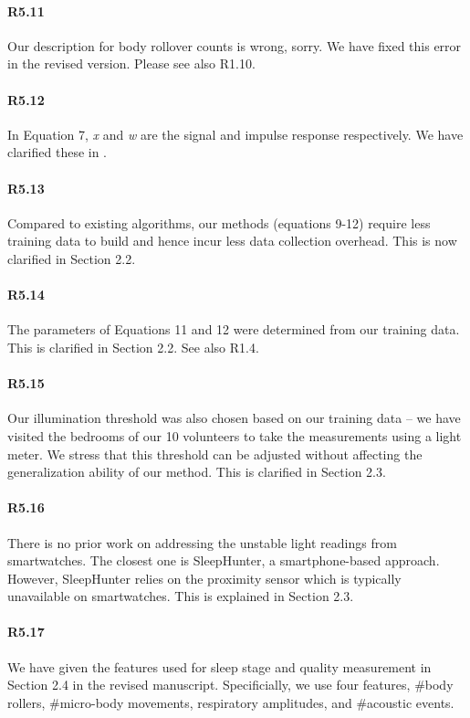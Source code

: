 \paragraph{R5.11} Our description for body rollover counts is wrong, sorry. We have fixed this error in the revised version. Please see
also R1.10.


\paragraph{R5.12} In Equation 7, \emph{x} and \emph{w} are the signal and impulse response respectively. We have clarified these in
.

\paragraph{R5.13} Compared to existing algorithms, our methods (equations 9-12) require less training data to build and hence incur less
data collection overhead. This is now clarified in Section 2.2.

\paragraph{R5.14} The parameters of Equations 11 and 12 were determined from our training data. This is clarified in Section 2.2. See also R1.4.

\paragraph{R5.15} Our illumination threshold was also chosen based on our training data -- we have visited the bedrooms of our 10 volunteers
to take the measurements using a light meter. We stress that this threshold can be adjusted without affecting the generalization ability of
our method. This is clarified in Section 2.3.

\paragraph{R5.16} There is no prior work on addressing the unstable light readings from smartwatches. The closest one is SleepHunter, a
smartphone-based approach. However, SleepHunter relies on the proximity sensor which is typically unavailable on smartwatches. This is
explained in Section 2.3.

\paragraph{R5.17} We have given the features used for sleep stage and quality measurement in Section 2.4 in the revised manuscript.
Specificially, we use four features, \#body rollers, \#micro-body movements, respiratory amplitudes, and \#acoustic events.

